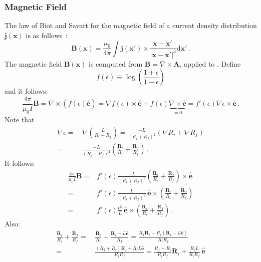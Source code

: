 \subsubsection{Magnetic Field}
The law of Biot and Savart for the magnetic field of a current density distribution $\mathbf{j}(\mathbf{x})$ is as follows~\cite{jackson}:
\begin{equation}
 \mathbf{B}(\mathbf{x}) = \frac{\mu_0}{4 \pi} \int \mathbf{j}(\mathbf{x}') \times \frac{\mathbf{x} - \mathbf{x}'~}{|\mathbf{x} - \mathbf{x}'|^3} \mathrm{d}\mathbf{x}' \, .
\end{equation}
The magnetic field $\mathbf{B}(\mathbf{x})$ is computed from $\mathbf{B} = \nabla \times \mathbf{A}$, applied to .
Define
\begin{equation}
 f(\epsilon) \equiv \log\left(\frac{1 + \epsilon}{1 - \epsilon} \right)
\end{equation}
and it follows:
\begin{equation}
  \frac{4 \pi}{\mu_0 I} \mathbf{B}
 = \nabla \times \left( f(\epsilon) \hat{\mathbf{e}} \right)
 = \nabla f(\epsilon) \times \hat{\mathbf{e}} + f(\epsilon) \underbrace{\nabla \times \hat{\mathbf{e}}}_{=0}
 = f'(\epsilon) \nabla \epsilon \times \hat{\mathbf{e}} \, .
\end{equation}
Note that
\begin{align}
   \nabla \epsilon
 =&\, \nabla \left( \frac{L}{R_i + R_f} \right)
 = \frac{-L}{(R_i + R_f)^2}\left( \nabla R_i + \nabla R_f \right) \nonumber \\
 =&\, \frac{-L}{(R_i + R_f)^2}\left( \frac{\mathbf{R}_i}{R_i} + \frac{\mathbf{R}_f}{R_f} \right) \, .
\end{align}
It follows:
\begin{align}
   \frac{4 \pi}{\mu_0 I} \mathbf{B}
 = & f'(\epsilon) \frac{-L}{(R_i + R_f)^2} \left( \frac{\mathbf{R}_i}{R_i} + \frac{\mathbf{R}_f}{R_f} \right) \times \hat{\mathbf{e}} \\
 = & f'(\epsilon) \frac{L}{(R_i + R_f)^2} \, \hat{\mathbf{e}} \times \left( \frac{\mathbf{R}_i}{R_i} + \frac{\mathbf{R}_f}{R_f} \right) \\
 = & f'(\epsilon) \frac{\epsilon^2}{L}    \, \hat{\mathbf{e}} \times \left( \frac{\mathbf{R}_i}{R_i} + \frac{\mathbf{R}_f}{R_f} \right) \, . \label{eqn:B_intermediate}
\end{align}
Also:
\begin{align}
   \frac{\mathbf{R}_i}{R_i} + \frac{\mathbf{R}_f}{R_f}
 =&\, \frac{\mathbf{R}_i}{R_i} + \frac{\mathbf{R}_i - L \hat{\mathbf{e}} }{R_f}
 =   \frac{R_f \mathbf{R}_i + R_i (\mathbf{R}_i - L \hat{\mathbf{e}}) }{R_i R_f} \nonumber \\
 =&\,   \frac{(R_f+R_i) \mathbf{R}_i + R_i L \hat{\mathbf{e}} }{R_i R_f}
 = \frac{R_f+R_i}{R_i R_f} \mathbf{R}_i + \frac{R_i L}{R_i R_f} \, \hat{\mathbf{e}}
\end{align}
